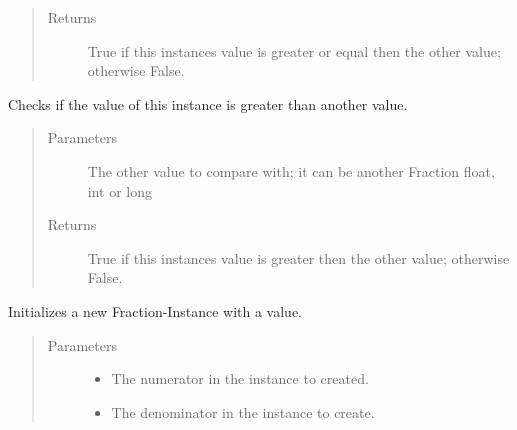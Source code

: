 \documentclass[letterpaper,10pt,english]{sphinxhowto}
\begin{document}
\begin{fulllineitems}
\begin{fulllineitems}
\begin{quote}
\begin{description}
\item[{Returns}] \leavevmode
True if this instances value is greater or equal then the other value; otherwise False.

\end{description}\end{quote}

\end{fulllineitems}


\begin{fulllineitems}
\label{\detokenize{fraction:fraction.Fraction.__gt__}}
Checks if the value of this instance is greater than another value.
\begin{quote}\begin{description}
\item[{Parameters}] \leavevmode
{} \textendash{} The other value to compare with; it can be another Fraction float, int or long

\item[{Returns}] \leavevmode
True if this instances value is greater then the other value; otherwise False.

\end{description}\end{quote}

\end{fulllineitems}


\begin{fulllineitems}
\label{\detokenize{fraction:fraction.Fraction.__init__}}
Initializes a new Fraction-Instance with a value.
\begin{quote}\begin{description}
\item[{Parameters}] \leavevmode\begin{itemize}
\item {} 
 \textendash{} The numerator in the instance to created.

\item {} 
 \textendash{} The denominator in the instance to create.

\end{itemize}


\end{description}
\end{quote}
\end{fulllineitems}
\end{fulllineitems}
\end{document}
